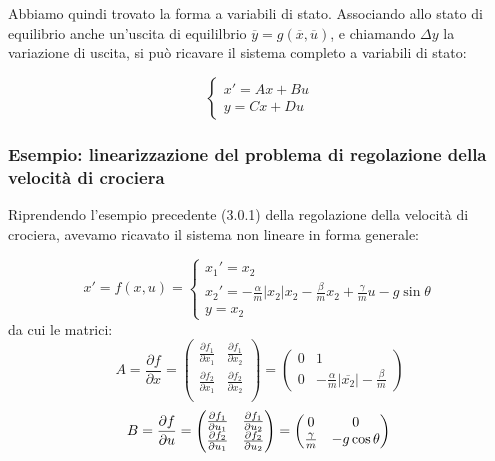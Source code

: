 \documentclass[a4paper,11pt]{article}
\begin{document}
Abbiamo quindi trovato la forma a variabili di stato.
Associando allo stato di equilibrio anche un'uscita di equililbrio $\overline{y} = g(\overline{x}, \overline{u})$, e chiamando $\Delta y$ la variazione di uscita, si può ricavare il sistema completo a variabili di stato:

\[
	\begin{cases}
		x' = Ax + Bu \\ 
		y = Cx + Du
	\end{cases}
\]

\subsubsection{Esempio: linearizzazione del problema di regolazione della velocità di crociera}
Riprendendo l'esempio precedente (3.0.1) della regolazione della velocità di crociera, avevamo ricavato il sistema non lineare in forma generale:

$$
x' = f(x, u) = 
	\begin{cases}
		x_1' = x_2 \\
		x_2' = -\frac{\alpha}{m} |x_2| x_2 - \frac{\beta}{m} x_2 + \frac{\gamma}{m} u - g \sin{\theta} \\ 
		y = x_2
	\end{cases}
$$
da cui le matrici:
$$
A = \frac{\partial f}{\partial x} = \begin{pmatrix}
	\frac{\partial f_1}{\partial x_1} & \frac{\partial f_1}{\partial x_2} \\ 
	\frac{\partial f_2}{\partial x_1} & \frac{\partial f_2}{\partial x_2} \\ 
\end{pmatrix} = \begin{pmatrix}
	0 & 1 \\ 
	0 & -\frac{\alpha}{m}|\overline{x_2}| - \frac{\beta}{m}
\end{pmatrix}
$$
$$
B = \frac{\partial f}{\partial u} = \begin{pmatrix}
	\frac{\partial f_1}{\partial u_1} & \frac{\partial f_1}{\partial u_2} \\ 
	\frac{\partial f_2}{\partial u_1} & \frac{\partial f_2}{\partial u_2} \\ 
\end{pmatrix} = \begin{pmatrix}
	0 & 0 \\ 
	\frac{\gamma}{m} & -g\cos{\theta} 
\end{pmatrix} \\
$$
\end{document}
